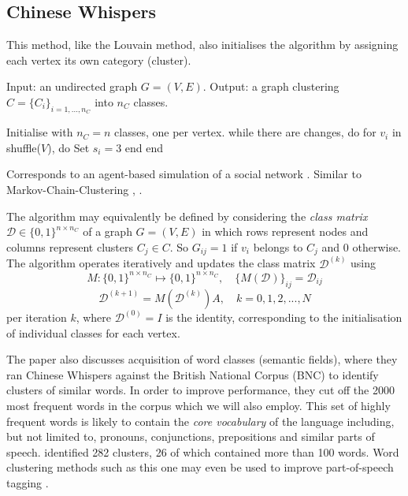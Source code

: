 \documentclass[12pt, a4paper]{article}
\begin{document}
  \subsection{Chinese Whispers}
  This method, like the Louvain method, also initialises the algorithm by assigning each vertex its own category (cluster).

  \begin{algorithm}[language=pseudo, caption={\centering The \textit{Chinese Whispers} algorithm due to \cite{cw-biemann}}]
Input: an undirected graph $G = (V, E)$.
Output: a graph clustering $C = \{C_i\}_{i=1, ..., n_C}$ into $n_C$ classes.

Initialise with $n_C = n$ classes, one per vertex.
while there are changes, do
  for $v_i$ in shuffle($V$), do
    Set $s_i = 3$
  end
end
  \end{algorithm}

  Corresponds to an agent-based simulation of a social network \cite{cw-biemann}.
  Similar to Markov-Chain-Clustering \cite{van-dongen}, \cite{fortunato}.

  The algorithm may equivalently be defined by considering the \textit{class matrix} $\mathcal{D} \in \{0, 1\}^{n \times n_C}$ of a graph $G = (V, E)$ in which rows represent nodes and columns represent clusters $C_j \in C$.
  So $G_{ij} = 1$ if $v_i$ belongs to $C_j$ and $0$ otherwise.
  The algorithm operates iteratively and updates the class matrix $\mathcal{D}^{(k)}$ using
  $$M: \{0, 1\}^{n \times n_C} \mapsto \{0, 1\}^{n \times n_C}, \quad \{M(\mathcal{D})\}_{ij} = \mathcal{D}_{ij}$$ %
  $$\mathcal{D}^{(k+1)} = M(\mathcal{D}^{(k)}) A, \quad k = 0, 1, 2, ..., N$$
  per iteration $k$, where $\mathcal{D}^{(0)} = I$ is the identity, corresponding to the initialisation of individual classes for each vertex.

  The paper also discusses acquisition of word classes (semantic fields), where they ran Chinese Whispers against the British National Corpus (BNC) to identify clusters of similar words.
  In order to improve performance, they cut off the 2000 most frequent words in the corpus which we will also employ.
  This set of highly frequent words is likely to contain the \textit{core vocabulary} of the language including, but not limited to, pronouns, conjunctions, prepositions and similar parts of speech.
  \cite{cw-biemann} identified 282 clusters, 26 of which contained more than 100 words.
  Word clustering methods such as this one may even be used to improve part-of-speech tagging \parencite{ushioda-improved-pos-tagging}.
\end{document}
